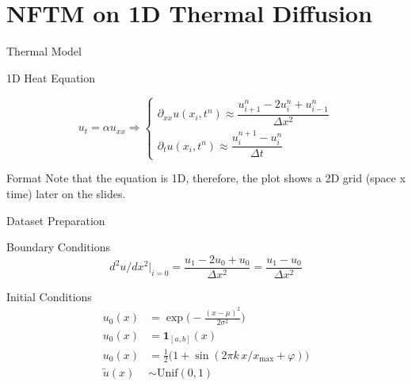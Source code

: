 \section{NFTM on 1D Thermal Diffusion}

\begin{secframe}
\small
\textcolor{red_unipd}{\Large Thermal Model}

\vspace{0.6em}

\begin{alertblock}{1D Heat Equation}

\begin{equation*}
   u_t = \alpha u_{xx} \Rightarrow
   \begin{cases}
      \partial_{xx} u(x_i,t^n) \approx \dfrac{u_{i+1}^n - 2u_i^n + u_{i-1}^n}{\Delta x^2} \\[1em]
      \partial_t u(x_i,t^n) \approx \dfrac{u_i^{n+1} - u_i^n}{\Delta t}
   \end{cases}
\end{equation*}

\end{alertblock}

\begin{block}{Format}
    Note that the equation is 1D, therefore, the plot shows a 2D grid (space x time) later on the slides.
\end{block}

\end{secframe}


\begin{secframe}
\small
\textcolor{red_unipd}{\Large Dataset Preparation}

\vspace{0.6em}

\begin{alertblock}{Boundary Conditions}
\[
d^2u/dx^2\big|_{i=0}=\frac{u_1-2u_0+u_0}{\Delta x^2}=\frac{u_1-u_0}{\Delta x^2}
\]
\end{alertblock}

\begin{alertblock}{Initial Conditions}
\begin{align*}
    u_0(x)&=\exp\!\Big(-\frac{(x-\mu)^2}{2\sigma^2}\Big)\\
    u_0(x)&=\mathbf{1}_{[a,b]}(x) \\
    u_0(x)&=\tfrac12\big(1+\sin(2\pi k\,x/x_{\max}+\varphi)\big) \\
    \tilde u(x)&\sim\text{Unif}(0,1)
\end{align*}

\end{alertblock}


\end{secframe}


